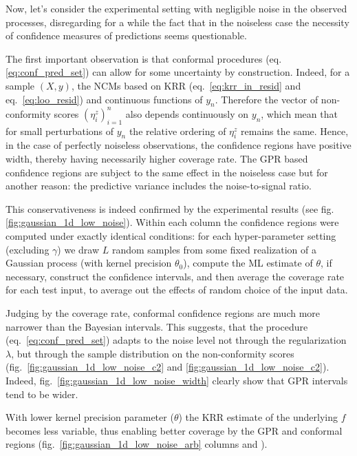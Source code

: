 \documentclass[a4paper,14pt]{extarticle}
\begin{document}
Now, let's consider the experimental setting with negligible noise in the observed
processes, disregarding for a while the fact that in the noiseless case the necessity
of confidence measures of predictions seems questionable.

The first important observation is that conformal procedures (eq.\ref{eq:conf_pred_set})
can allow for some uncertainty by construction. Indeed, for a sample $(X, y)$, the
NCMs based on KRR (eq.~\ref{eq:krr_in_resid} and eq.~\ref{eq:loo_resid}) and continuous
functions of $y_n$. Therefore the vector of non-conformity scores $(\eta^z_i)_{i=1}^n$
also depends continuously on $y_n$, which mean that for small perturbations of $y_n$
the relative ordering of $\eta^z_i$ remains the same. Hence, in the case of perfectly
noiseless observations, the confidence regions have positive width, thereby having
necessarily higher coverage rate. The GPR based confidence regions are subject to
the same effect in the noiseless case but for another reason: the predictive variance
includes the noise-to-signal ratio.

This conservativeness is indeed confirmed by the experimental results (see fig.~
\ref{fig:gaussian_1d_low_noise}). Within each column the confidence regions were
computed under exactly identical conditions: for each hyper-parameter setting (excluding
$\gamma$) we draw $L$ random samples from some fixed realization of a Gaussian process
(with kernel precision $\theta_0$), compute the ML estimate of $\theta$, if necessary,
construct the confidence intervals, and then average the coverage rate for each test
input, to average out the effects of random choice of the input data.

Judging by the coverage rate, conformal confidence regions are much more narrower
than the Bayesian intervals. This suggests, that the procedure (eq.~\ref{eq:conf_pred_set})
adapts to the noise level not through the regularization $\lambda$, but through
the sample distribution on the non-conformity scores (fig.~\ref{fig:gaussian_1d_low_noise_c2}
and \ref{fig:gaussian_1d_low_noise_c2}). Indeed, fig.~\ref{fig:gaussian_1d_low_noise_width}
clearly show that GPR intervals tend to be wider.

With lower kernel precision parameter ($\theta$) the KRR estimate of the underlying
$f$ becomes less variable, thus enabling better coverage by the GPR and conformal
regions (fig.~\ref{fig:gaussian_1d_low_noise_arb} columns 
and ).
\end{document}
